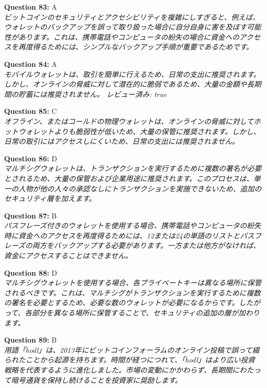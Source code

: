 \documentclass[12pt,a4paper]{article}
\begin{document}
\begin{enumerate}
{{{{{{\item \textbf{Question 83:} A
\\ \textit{ビットコインのセキュリティとアクセシビリティを複雑にしすぎると、例えば、ウォレットのバックアップを誤って取り扱った場合に自分自身に害を及ぼす可能性があります。これは、携帯電話やコンピュータの紛失の場合に資金へのアクセスを再度得るためには、シンプルなバックアップ手順が重要であるためです。}

\item \textbf{Question 84:} A
\\ \textit{モバイルウォレットは、取引を簡単に行えるため、日常の支出に推奨されます。しかし、オンラインの脅威に対して潜在的に脆弱であるため、大量の金額や長期間の貯蓄には推奨されません。
レビュー済み: true}

\item \textbf{Question 85:} C
\\ \textit{オフライン、またはコールドの物理ウォレットは、オンラインの脅威に対してホットウォレットよりも脆弱性が低いため、大量の保管に推奨されます。しかし、日常の取引にはアクセスしにくいため、日常の支出には推奨されません。}

\item \textbf{Question 86:} D
\\ \textit{マルチシグウォレットは、トランザクションを実行するために複数の署名が必要とされるため、大量の保管および企業用途に推奨されます。このプロセスは、単一の人物が他の人々の承認なしにトランザクションを実施できないため、追加のセキュリティ層を加えます。}

\item \textbf{Question 87:} B
\\ \textit{パスフレーズ付きのウォレットを使用する場合、携帯電話やコンピュータの紛失時に資金へのアクセスを再度得るためには、12または24の単語のリストとパスフレーズの両方をバックアップする必要があります。一方または他方がなければ、資金にアクセスすることはできません。}

\item \textbf{Question 88:} D
\\ \textit{マルチシグウォレットを使用する場合、各プライベートキーは異なる場所に保管されるべきです。これは、マルチシグがトランザクションを実行するために複数の署名を必要とするため、必要な数のウォレットが必要になるからです。したがって、各部分を異なる場所に保管することで、セキュリティの追加の層が加わります。}

\item \textbf{Question 89:} B
\\ \textit{用語「hodl」は、2013年にビットコインフォーラムのオンライン投稿で誤って綴られたことから起源を持ちます。時間が経つにつれて、「hodl」はより広い投資戦略を代表するように進化しました。市場の変動にかかわらず、長期間にわたって暗号通貨を保持し続けることを投資家に奨励します。}

}}}}}}
\end{enumerate}
\end{document}
